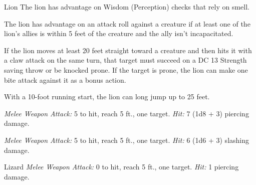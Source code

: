\documentclass[10pt,a4paper,twoside,bg=print,twocolumn,openany,nodeprecatedcode]{dndbook}
\begin{document}
\begin{DndMonster}[float=t]{Lion}
\DndMonsterBasics[
armor-class = {12},
hit-points = {\DndDice{4d10 + 4}},
speed = {50 ft.}
]
\DndMonsterAbilityScores[
 str = 17,
 dex = 15,
 con = 13,
 int = 3,
 wis = 12,
 cha = 8
]
\DndMonsterDetails[
skills = {Perception +3, Stealth +6},
challenge = 1,
]
The lion has advantage on Wisdom (Perception) checks that rely on smell.

The lion has advantage on an attack roll against a creature if at least one of the lion's allies is within 5 feet of the creature and the ally isn't incapacitated.

If the lion moves at least 20 feet straight toward a creature and then hits it with a claw attack on the same turn, that target must succeed on a DC 13 Strength saving throw or be knocked prone. If the target is prone, the lion can make one bite attack against it as a bonus action.

With a 10-foot running start, the lion can long jump up to 25 feet.

\textsl{Melee Weapon Attack:} 5 to hit, reach 5 ft., one target. \textsl{Hit:} 7 (1d8 + 3) piercing damage.

\textsl{Melee Weapon Attack:} 5 to hit, reach 5 ft., one target. \textsl{Hit:} 6 (1d6 + 3) slashing damage.

\end{DndMonster}



\begin{DndMonster}[float=t]{Lizard}
\DndMonsterBasics[
armor-class = {10},
hit-points = {\DndDice{1d4}},
speed = {20 ft., climb 20 ft.}
]
\DndMonsterAbilityScores[
 str = 2,
 dex = 11,
 con = 10,
 int = 1,
 wis = 8,
 cha = 3
]
\DndMonsterDetails[
senses = {darkvision 30 ft., passive perception 9},
challenge = 0,
]
\textsl{Melee Weapon Attack:} 0 to hit, reach 5 ft., one target. \textsl{Hit:} 1 piercing damage.

\end{DndMonster}
\end{document}

